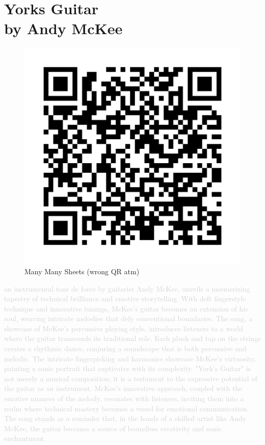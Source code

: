 \chapter[Yorks Guitar]{Yorks Guitar\\[1ex]\large{by Andy McKee}}

\begin{figure}
\includegraphics[width=1\linewidth]{QR_Codes/QR_SultansOfSwing_BassChords.png}\\
Many Many Sheets (wrong QR atm)
\end{figure}

\textcolor{lightgray}{an instrumental tour de force by guitarist Andy McKee, unveils a mesmerizing tapestry of technical brilliance and emotive storytelling. With deft fingerstyle technique and innovative tunings, McKee's guitar becomes an extension of his soul, weaving intricate melodies that defy conventional boundaries.
The song, a showcase of McKee's percussive playing style, introduces listeners to a world where the guitar transcends its traditional role. Each pluck and tap on the strings creates a rhythmic dance, conjuring a soundscape that is both percussive and melodic. The intricate fingerpicking and harmonics showcase McKee's virtuosity, painting a sonic portrait that captivates with its complexity.
"York's Guitar" is not merely a musical composition; it is a testament to the expressive potential of the guitar as an instrument. McKee's innovative approach, coupled with the emotive nuances of the melody, resonates with listeners, inviting them into a realm where technical mastery becomes a vessel for emotional communication. The song stands as a reminder that, in the hands of a skilled artist like Andy McKee, the guitar becomes a source of boundless creativity and sonic enchantment.}\\
